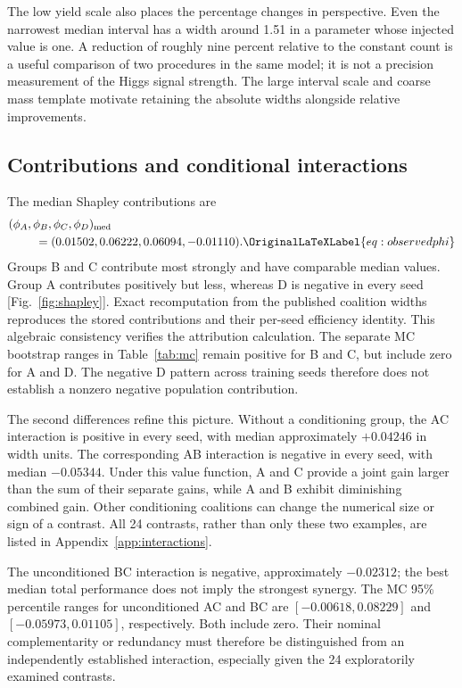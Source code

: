 \documentclass[aps,prd,reprint,superscriptaddress,nofootinbib,longbibliography,floatfix]{revtex4-2}
\let\label\OriginalLaTeXLabel
\begin{document}
The low yield scale also places the percentage changes in perspective.
Even the narrowest median interval has a width around 1.51 in a parameter
whose injected value is one. A reduction of roughly nine percent relative
to the constant count is a useful comparison of two procedures in the same
model; it is not a precision measurement of the Higgs signal strength. The
large interval scale and coarse mass template motivate retaining the
absolute widths alongside relative improvements.

\subsection{Contributions and conditional interactions}

The median Shapley contributions are
\begin{align}
 &(\phi_A,\phi_B,\phi_C,\phi_D)_{\mathrm{med}}\nonumber\\
 &\hspace{8mm}= (\PhiA,\PhiB,\PhiC,\PhiD).
 \label{eq:observedphi}
\end{align}
Groups B and C contribute most strongly and have comparable median values.
Group A contributes positively but less, whereas D is negative in every
seed [Fig.~\ref{fig:shapley}]. Exact recomputation from the published
coalition widths reproduces the stored contributions and their per-seed
efficiency identity. This algebraic consistency verifies the attribution
calculation. The separate MC bootstrap ranges in Table~\ref{tab:mc} remain
positive for B and C, but include zero for A and D. The negative D pattern
across training seeds therefore does not establish a nonzero negative
population contribution.



The second differences refine this picture. Without a conditioning group,
the AC interaction is positive in every seed, with median approximately
$+0.04246$ in width units. The corresponding AB interaction is negative
in every seed, with median $-0.05344$. Under this value function, A and C
provide a joint gain larger than the sum of their separate gains, while
A and B exhibit diminishing combined gain. Other conditioning coalitions
can change the numerical size or sign of a contrast. All 24 contrasts,
rather than only these two examples, are listed in
Appendix~\ref{app:interactions}.

The unconditioned BC interaction is negative, approximately $-0.02312$;
the best median total performance does not imply the strongest synergy.
The MC 95\% percentile ranges for unconditioned AC and BC are
$[-0.00618,0.08229]$ and $[-0.05973,0.01105]$, respectively. Both include
zero. Their nominal complementarity or redundancy must therefore be
distinguished from an independently established interaction, especially
given the 24 exploratorily examined contrasts.
\end{document}
